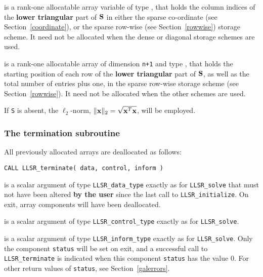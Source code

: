 \documentclass{galahad}
\newcommand{\packagename}{LLSR}
\begin{document}
\begin{description}
\begin{description}
 is a rank-one allocatable array variable of type \integer,
that holds the column indices of the {\bf lower triangular} part of
${\mathbf{S}}$ in either the sparse co-ordinate
(see Section~\ref{coordinate}), or the sparse row-wise
(see Section~\ref{rowwise}) storage scheme.
It need not be allocated when the dense or diagonal storage schemes are used.

 is a rank-one allocatable array of dimension {\tt n+1} and type
\integer, that holds the starting position of
each row of the {\bf lower triangular} part of ${\mathbf{S}}$, as well
as the total number of entries plus one, in the sparse row-wise storage
scheme (see Section~\ref{rowwise}). It need not be allocated when the
other schemes are used.

\end{description}
If {\tt S} is absent, the $\ell_2$-norm, $\|{\mathbf{x}}\|_2 = \sqrt{{\mathbf{x}}^T {\mathbf{x}}}$,
will be employed.


\end{description}


\subsubsection{The  termination subroutine}
All previously allocated arrays are deallocated as follows:

\hskip0.5in
{\tt CALL \packagename\_terminate( data, control, inform )}

\begin{description}

 is a scalar \intentinout argument of type
{\tt \packagename\_data\_type}
exactly as for
{\tt \packagename\_solve}
that must not have been altered {\bf by the user} since the last call to
{\tt \packagename\_initialize}.
On exit, array components will have been deallocated.

 is a scalar \intentin argument of type
{\tt \packagename\_control\_type}
exactly as for
{\tt \packagename\_solve}.

 is a scalar \intentout argument of type
{\tt \packagename\_inform\_type}
exactly as for
{\tt \packagename\_solve}.
Only the component {\tt status} will be set on exit, and a
successful call to
{\tt \packagename\_terminate}
is indicated when this  component {\tt status} has the value 0.
For other return values of {\tt status}, see Section~\ref{galerrors}.

\end{description}
\end{document}
